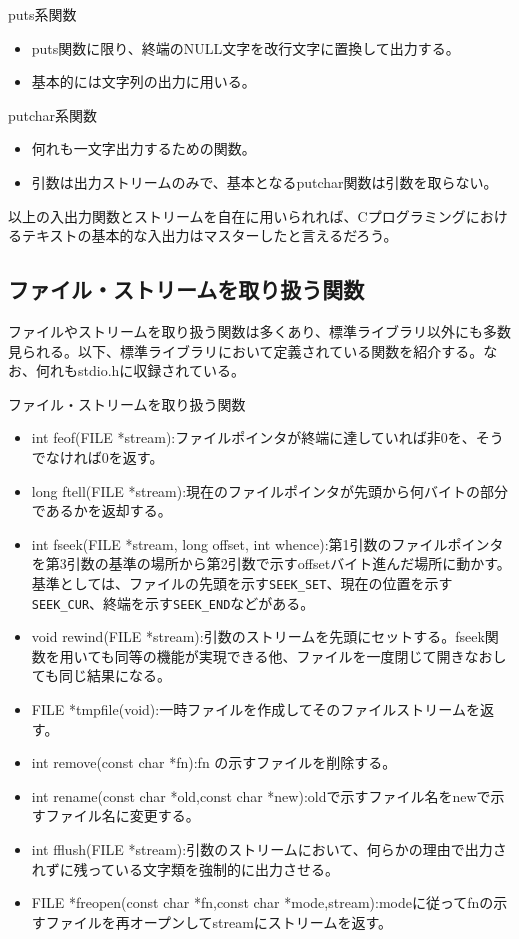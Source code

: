 \begin{itembox}[l]{puts系関数}
\begin{itemize}
\item puts関数に限り、終端のNULL文字を改行文字に置換して出力する。
\item 基本的には文字列の出力に用いる。
\end{itemize}
\end{itembox}

\begin{itembox}[l]{putchar系関数}
\begin{itemize}
\item 何れも一文字出力するための関数。
\item 引数は出力ストリームのみで、基本となるputchar関数は引数を取らない。
\end{itemize}
\end{itembox}

以上の入出力関数とストリームを自在に用いられれば、Cプログラミングにおけるテキストの基本的な入出力はマスターしたと言えるだろう。

\subsection{ファイル・ストリームを取り扱う関数}
ファイルやストリームを取り扱う関数は多くあり、標準ライブラリ以外にも多数見られる。以下、標準ライブラリにおいて定義されている関数を紹介する。なお、何れもstdio.hに収録されている。
\begin{itembox}[l]{ファイル・ストリームを取り扱う関数}
\begin{itemize}
\item int feof(FILE *stream):ファイルポインタが終端に達していれば非0を、そうでなければ0を返す。
\item long ftell(FILE *stream):現在のファイルポインタが先頭から何バイトの部分であるかを返却する。
\item int fseek(FILE *stream, long offset, int whence):第1引数のファイルポインタを第3引数の基準の場所から第2引数で示すoffsetバイト進んだ場所に動かす。基準としては、ファイルの先頭を示す\verb|SEEK_SET|、現在の位置を示す\verb|SEEK_CUR|、終端を示す\verb|SEEK_END|などがある。
\item void rewind(FILE *stream):引数のストリームを先頭にセットする。fseek関数を用いても同等の機能が実現できる他、ファイルを一度閉じて開きなおしても同じ結果になる。
\item FILE *tmpfile(void):一時ファイルを作成してそのファイルストリームを返す。
\item int remove(const char *fn):fn の示すファイルを削除する。
\item int rename(const char *old,const char *new):oldで示すファイル名をnewで示すファイル名に変更する。
\item int fflush(FILE *stream):引数のストリームにおいて、何らかの理由で出力されずに残っている文字類を強制的に出力させる。
\item FILE *freopen(const char *fn,const char *mode,stream):modeに従ってfnの示すファイルを再オープンしてstreamにストリームを返す。
\end{itemize}
\end{itembox}

